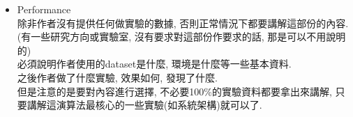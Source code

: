 \begin{enumerate}
{\begin{itemize}
{\begin{enumerate}
          \item
          {
            Lemma\\
            是Theorem分開用來簡單說明的一個東西
          } %

          \item
          {
            Theorem\\
            是Lemma集合出的一個理論
          } %

          \item
          {
            Corollary\\
            在Theorem的結果用另一種條件或什麼得出的另一結果
          } %

          \item
          {
            Proposition\\
            以上的看情況來決定要不要講, 如果是跟algorithm無關的, 則不用講, 否則要講一點點.\\

            如果不講定理, 都能講懂algorithm, 那則不用講.\\
            而如果algorithm會使用到一個小小的定理, 即只要講定理的結果.
          } %

          \item
          {
            Proof\\
            在報告時是絕對不用講的
          } %
        \end{enumerate}
      } %

      \item
      {
        Performance\\
        除非作者沒有提供任何做實驗的數據, 否則正常情況下都要講解這部份的內容.\\
        (有一些研究方向或實驗室, 沒有要求對這部份作要求的話, 那是可以不用說明的)\\
         
        必須說明作者使用的dataset是什麼, 環境是什麼等一些基本資料.\\
         
        之後作者做了什麼實驗, 效果如何, 發現了什麼.\\
         
        但是注意的是要對內容進行選擇, 不必要100\%的實驗資料都要拿出來講解, 只要講解這演算法最核心的一些實驗(如系統架構)就可以了.
      } %


\end{itemize}}
\end{enumerate}
